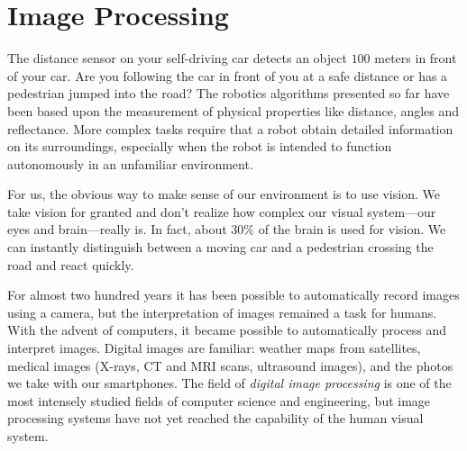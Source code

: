 
\chapter{Image Processing}\label{ch.image}


The distance sensor on your self-driving car detects an object $100$ meters in front of your car. Are you following the car in front of you at a safe distance or has a pedestrian jumped into the road? The robotics algorithms presented so far have been based upon the measurement of physical properties like distance, angles and reflectance. More complex tasks require that a robot obtain detailed information on its surroundings, especially when the robot is intended to function autonomously in an unfamiliar environment.

For us, the obvious way to make sense of our environment is to use vision. We take vision for granted and don't realize how complex our visual system---our eyes and brain---really is. In fact, about $30\%$ of the brain is used for vision. We can instantly distinguish between a moving car and a pedestrian crossing the road and react quickly.

For almost two hundred years it has been possible to automatically record images using a camera, but the interpretation of images remained a task for humans. With the advent of computers, it became possible to automatically process and interpret images. Digital images are familiar: weather maps from satellites, medical images (X-rays, CT and MRI scans, ultrasound images), and the photos we take with our smartphones. The field of \emph{digital image processing} is one of the most intensely studied fields of computer science and engineering, but image processing systems have not yet reached the capability of the human visual system.

